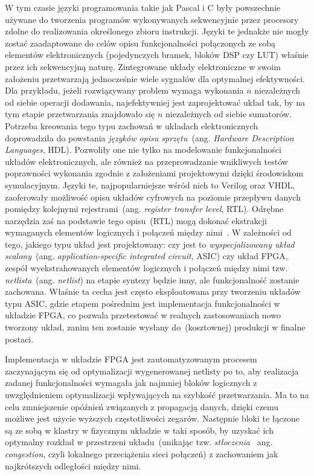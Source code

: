 W tym czasie języki programowania takie jak Pascal i C były powszechnie używane do tworzenia programów wykonywanych sekwencyjnie przez procesory zdolne do realizowania określonego zbioru instrukcji. Języki te jednakże nie mogły zostać zaadaptowane do celów opisu funkcjonalności połączonych ze sobą elementów elektronicznych (pojedynczych bramek, bloków DSP czy LUT) właśnie przez ich sekwencyjną naturę. Zintegrowane układy elektroniczne w swoim założeniu przetwarzają jednocześnie wiele sygnałów dla optymalnej efektywności. Dla przykładu, jeżeli rozwiązywany problem wymaga wykonania $n$ niezależnych od siebie operacji dodawania, najefektywniej jest zaprojektować układ tak, by na tym etapie przetwarzania znajdowało się $n$ niezależnych od siebie sumatorów. Potrzeba kreowania tego typu zachowań w układach elektronicznych doprowadziła do powstania \textit{języków opisu sprzętu}~(ang. \textit{Hardware Description Languages}, HDL). Pozwoliły one nie tylko na modelowanie funkcjonalności układów elektronicznych, ale również na przeprowadzanie wnikliwych testów poprawności wykonania zgodnie z założeniami projektowymi dzięki środowiskom symulacyjnym. Języki te, najpopularniejsze wśród nich to Verilog oraz VHDL, zaoferowały możliwość opisu układów cyfrowych na poziomie przepływu danych pomiędzy kolejnymi rejestrami~(ang. \textit{register transfer level}, RTL). Odrębne narzędzia zaś na podstawie tego opisu~(RTL) mogą dokonać ekstrakcji wymaganych elementów logicznych i połączeń między nimi~\cite{VERILOG_BIBLE}. W zależności od tego, jakiego typu układ jest projektowany: czy jest to \textit{wyspecjalizowany układ scalony}~(ang. \textit{application-specific integrated circuit}, ASIC) czy układ FPGA, zespół wyekstrahowanych elementów logicznych i połączeń między nimi tzw. \textit{netlista}~(ang. \textit{netlist}) na etapie syntezy będzie inny, ale funkcjonalność zostanie zachowana. Właśnie ta cecha jest często eksploatowana przy tworzeniu układów typu ASIC, gdzie etapem pośrednim jest implementacja funkcjonalności w układzie FPGA, co pozwala przetestować w realnych zastosowaniach nowo tworzony układ, zanim ten zostanie wysłany do~(kosztownej) produkcji w finalne postaci. 

Implementacja w układzie FPGA jest zautomatyzowanym procesem zaczynającym się od optymalizacji wygenerowanej netlisty po to, aby realizacja zadanej funkcjonalności wymagała jak najmniej bloków logicznych z uwzględnieniem optymalizacji wpływających na szybkość przetwarzania. Ma to na celu zmniejszenie opóźnień związanych z propagacją danych, dzięki czemu możliwe jest użycie wyższych częstotliwości zegarów. Następnie bloki te łączone są ze sobą w klastry w fizycznym układzie w taki sposób, by uzyskać ich optymalny rozkład w przestrzeni układu~(unikając tzw. \textit{stłoczenia}~ ang. \textit{congestion}, czyli lokalnego przeciążenia sieci połączeń) z zachowaniem jak najkrótszych odległości między nimi. 

